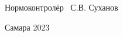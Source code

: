{
\linespread{1}\selectfont
\advance\leftskip 2cm
\advance\rightskip 1.25cm
\noindent
Нормоконтролёр \hrulefill \ С.В. Суханов\par
}

\vfill
\begin{center}
Самара  2023
\end{center}

\clearpage
